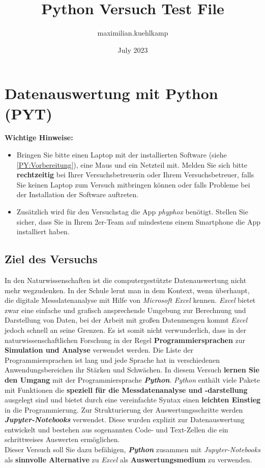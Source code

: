 \documentclass[12pt]{scrbook}
\title{Python Versuch Test File}
\author{maximilian.kuehlkamp }
\date{July 2023}
\begin{document}
\chapter{Datenauswertung mit Python (PYT)}

\textbf{Wichtige Hinweise:} 
\begin{itemize}
    \item Bringen Sie bitte einen Laptop mit der installierten Software (siehe \autoref{PY:Vorbereitung}), eine Maus und ein Netzteil mit. Melden Sie sich bitte \textbf{rechtzeitig} bei Ihrer Versuchsbetreuerin oder Ihrem Versuchsbetreuer, falls Sie keinen Laptop zum Versuch mitbringen können oder falls Probleme bei der Installation der Software auftreten.
    \item Zusätzlich wird für den Versuchstag die App \textit{phyphox} benötigt. Stellen Sie sicher, dass Sie in Ihrem 2er-Team auf mindestens einem Smartphone die App installiert haben.
\end{itemize}


\section{Ziel des Versuchs}

In den Naturwissenschaften ist die computergestützte Datenauswertung nicht mehr wegzudenken. In der Schule lernt man in dem Kontext, wenn überhaupt, die digitale Messdatenanalyse mit Hilfe von \textit{Microsoft Excel} kennen. \textit{Excel} bietet zwar eine einfache und grafisch ansprechende Umgebung zur Berechnung und Darstellung von Daten, bei der Arbeit mit großen Datenmengen kommt \textit{Excel} jedoch schnell an seine Grenzen. Es ist somit nicht verwunderlich, dass in der naturwissenschaftlichen Forschung in der Regel \textbf{Programmiersprachen} zur \textbf{Simulation und Analyse} verwendet werden. Die Liste der Programmiersprachen ist lang und jede Sprache hat in verschiedenen Anwendungsbereichen ihr Stärken und Schwächen. In diesem Versuch \textbf{lernen Sie den Umgang}  mit der Programmiersprache \textbf{\textit{Python}}. \textit{Python} enthält viele Pakete mit Funktionen die \textbf{speziell für die Messdatenanalyse und -darstellung} ausgelegt sind und bietet durch eine vereinfachte Syntax einen \textbf{leichten Einstieg} in die Programmierung. Zur Strukturierung der Auswertungsschritte werden \textbf{\textit{Jupyter-Notebooks}} verwendet. Diese wurden explizit zur Datenauswertung entwickelt und bestehen aus sogenannten Code- und Text-Zellen die ein schrittweises Auswerten ermöglichen.\\
Dieser Versuch soll Sie dazu befähigen, \textbf{\textit{Python}} zusammen mit \textit{Jupyter-Notebooks} als \textbf{sinnvolle Alternative} zu \textit{Excel} als \textbf{Auswertungsmedium} zu verwenden.
\end{document}
